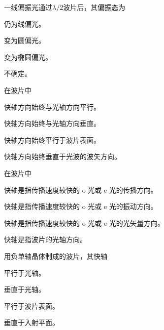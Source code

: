 \documentclass[padl, analysis, notocnum]{ExBook}
\newcommand{\answerarea}[1][3.5cm]{%
  \par\vspace{1mm}%
  \noindent{\color{themeColor!35}\rule{\linewidth}{0.4pt}}\par
  \noindent\begin{minipage}[t][#1][t]{\linewidth}\vspace{0pt}\end{minipage}\par
  \noindent{\color{themeColor!35}\rule{\linewidth}{0.4pt}}\par
}
\begin{document}
\begin{qitems}[startnum=6]
\qitem 一线偏振光通过$\lambda /2$波片后，其偏振态为
\par\noindent\hspace{2em}仍为线偏光。
\par\noindent\hspace{2em}变为圆偏光。
\par\noindent\hspace{2em}变为椭圆偏光。
\par\noindent\hspace{2em}不确定。
\label{q:305:start}
\answerarea[4.0cm]
\label{q:305:end}
\end{qitems}

\begin{qitems}[startnum=7]
\qitem 在波片中
\par\noindent\hspace{2em}快轴方向始终与光轴方向平行。
\par\noindent\hspace{2em}快轴方向始终与光轴方向垂直。
\par\noindent\hspace{2em}快轴方向始终平行于波片表面。
\par\noindent\hspace{2em}快轴方向始终垂直于光波的波矢方向。
\label{q:306:start}
\answerarea[4.0cm]
\label{q:306:end}
\end{qitems}

\begin{qitems}[startnum=8]
\qitem 在波片中
\par\noindent\hspace{2em}快轴是指传播速度较快的 o 光或 e 光的传播方向。
\par\noindent\hspace{2em}快轴是指传播速度较快的 o 光或 e 光的振动方向。
\par\noindent\hspace{2em}快轴是指传播速度较快的 o 光或 e 光的光矢量方向。
\par\noindent\hspace{2em}快轴是指波片的光轴方向。
\label{q:307:start}
\answerarea[4.0cm]
\label{q:307:end}
\end{qitems}

\begin{qitems}[startnum=9]
\qitem 用负单轴晶体制成的波片，其快轴
\par\noindent\hspace{2em}平行于光轴。
\par\noindent\hspace{2em}垂直于光轴。
\par\noindent\hspace{2em}平行于波片表面。
\par\noindent\hspace{2em}垂直于入射平面。
\label{q:308:start}
\answerarea[4.0cm]
\label{q:308:end}
\end{qitems}
\end{document}
